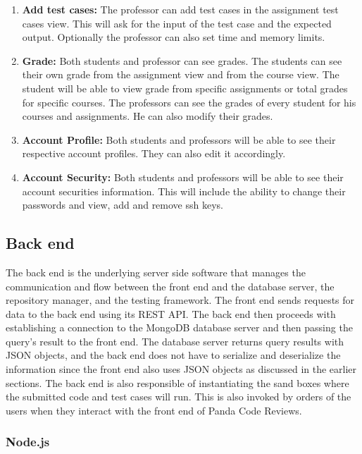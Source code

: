 \begin{enumerate}
\item \textbf{Add test cases:} The professor can add test cases in the
assignment test cases view. This will ask for the input of the test case and the
expected output. Optionally the professor can also set time and memory limits.

\item \textbf{Grade:} Both students and professor can see grades. The students
can see their own grade from the assignment view and from the course view. The
student will be able to view grade from specific assignments or total grades for
specific courses. The professors can see the grades of every student for his
courses and assignments. He can also modify their grades.

\item \textbf{Account Profile:} Both students and professors will be able to see
their respective account profiles. They can also edit it accordingly.

\item \textbf{Account Security:} Both students and professors will be able to
see their account securities information. This will include the ability to
change their passwords and view, add and remove ssh keys.


\end{enumerate}

\subsection{Back end}

The back end is the underlying server side software that manages the
communication and flow between the front end and the database server, the
repository manager, and the testing framework. The front end sends requests for
data to the back end using its REST API. The back end then proceeds with
establishing a connection to the MongoDB\cite{mongodb} database server and then
passing the query's result to the front end. The database server returns query
results with JSON objects, and the back end does not have to serialize and
deserialize the information since the front end also uses JSON objects as
discussed in the earlier sections. The back end is also responsible of
instantiating the sand boxes where the submitted code and test cases will run.
This is also invoked by orders of the users when they interact with the front
end of Panda Code Reviews.

\subsubsection{Node.js}

